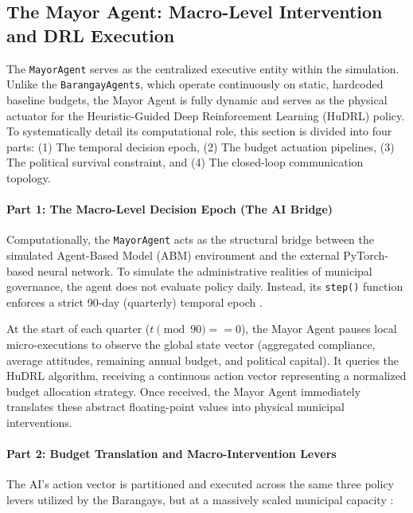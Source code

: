 \subsection{The Mayor Agent: Macro-Level Intervention and DRL Execution}

The \texttt{MayorAgent} serves as the centralized executive entity within the simulation. Unlike the \texttt{BarangayAgents}, which operate continuously on static, hardcoded baseline budgets, the Mayor Agent is fully dynamic and serves as the physical actuator for the Heuristic-Guided Deep Reinforcement Learning (HuDRL) policy. To systematically detail its computational role, this section is divided into four parts: (1) The temporal decision epoch, (2) The budget actuation pipelines, (3) The political survival constraint, and (4) The closed-loop communication topology.

\paragraph{Part 1: The Macro-Level Decision Epoch (The AI Bridge)}

Computationally, the \texttt{MayorAgent} acts as the structural bridge between the simulated Agent-Based Model (ABM) environment and the external PyTorch-based neural network. To simulate the administrative realities of municipal governance, the agent does not evaluate policy daily. Instead, its \texttt{step()} function enforces a strict 90-day (quarterly) temporal epoch \citep{Akbarpour2021}. 

At the start of each quarter ($t \pmod{90} == 0$), the Mayor Agent pauses local micro-executions to observe the global state vector (aggregated compliance, average attitudes, remaining annual budget, and political capital). It queries the HuDRL algorithm, receiving a continuous action vector representing a normalized budget allocation strategy. Once received, the Mayor Agent immediately translates these abstract floating-point values into physical municipal interventions.

\paragraph{Part 2: Budget Translation and Macro-Intervention Levers}
The AI's action vector is partitioned and executed across the same three policy levers utilized by the Barangays, but at a massively scaled municipal capacity \citep{Ibanez2022}:

